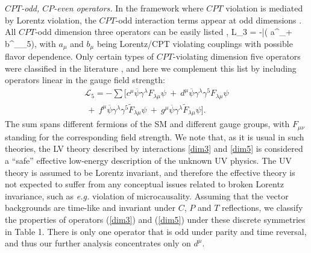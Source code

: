 \documentclass[prl,twocolumn,tightenlines,preprintnumbers,floatfix,nofootinbib]{revtex4}
\def\ba{\begin{eqnarray}}
\def\ea{\end{eqnarray}}
\begin{document}
{\em $CPT$-odd, $CP$-even operators.} In the framework where $CPT$ violation 
is mediated by Lorentz violation, the
$CPT$-odd interaction terms appear at odd dimensions \cite{Kost}. 
All $CPT$-odd dimension three operators can be easily listed \cite{Kost}, 
\be
{\cal L}_3 = -\sum \bar \psi( a^\mu \gamma_\mu + b^\mu \gamma_\mu \gamma_5)\psi,
\label{dim3}
\ee
with $a_\mu$ and $b_\mu$ being Lorentz/CPT violating couplings with possible flavor dependence. 
Only certain types of $CPT$-violating dimension five operators
were classified in the literature \cite{MP}, and here we complement this list by 
including operators linear in the gauge field strength:
\ba
\mathcal{L}_{ 5} =  -\sum [\nonumber
	c^\mu \overline{\psi} \gamma^\lambda F_{\lambda\mu} \psi
	~+~
	d^\mu \overline{\psi} \gamma^\lambda \gamma^5 F_{\lambda\mu} \psi
	\\~+~
{f}^\mu \overline{\psi} \gamma^\lambda \gamma^5
	\widetilde{F}_{\lambda\mu} \psi
	~+~
{g}^\mu  \overline{\psi} \gamma^\lambda 
	\widetilde{F}_{\lambda\mu}  \psi].
	\label{dim5}
\ea
The sum spans different fermions of the SM and different gauge groups, 
with $F_{\mu\nu}$ standing for the corresponding field strength. 
We note that, as it is usual in such theories, the LV theory described by interactions \eqref{dim3} 
and \eqref{dim5} is considered a ``safe'' effective low-energy description of the unknown UV physics.
The UV theory is assumed to be Lorentz invariant, and therefore the effective theory is not
expected to suffer from any conceptual issues related to broken Lorentz invariance, such as
{\it e.g.} violation of microcausality.
Assuming that the vector backgrounds are time-like and invariant under $C$, $P$ and $T$ reflections, 
we classify the properties of operators (\ref{dim3}) and (\ref{dim5}) under these 
discrete symmetries in Table 1. There is only one operator 
that is odd under parity and time reversal, and thus our further analysis concentrates
only on $d^\mu$. 
\end{document}
